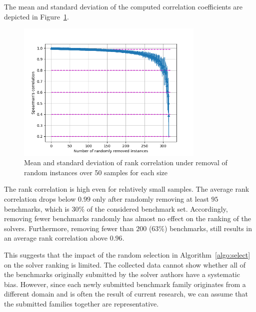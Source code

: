 \documentclass{elsarticle}
\begin{document}
The mean and standard deviation of the computed correlation coefficients are
depicted in Figure~\ref{fig:sampleAll}.
\begin{figure}[h]
  \label{fig:sampleAll}
  \centering
  \includegraphics[width=0.8\textwidth]{stability/ALL_random_smpling_correlations.png}
  \caption{Mean and standard deviation of rank correlation under removal of random instances over 50 samples for each size}
\end{figure}
The rank correlation is high even for relatively small samples.
The average rank correlation drops below $0.99$ only after randomly removing at least $95$ benchmarks, which is $30\%$ of the considered benchmark set. Accordingly, removing fewer benchmarks randomly has almost no effect on the ranking of the solvers.
Furthermore, removing fewer than $200$ ($63\%$) benchmarks, still results in an average rank correlation above $0.96$.

This suggests that the impact of the random selection in Algorithm~\ref{algo:select} on the solver ranking is limited.
The collected data cannot show whether all of the benchmarks originally
submitted by the solver authors have a systematic bias. However, since each
newly submitted benchmark family originates from a different domain and is often
the result of current research, we can assume that the submitted families
together are representative.
\end{document}

